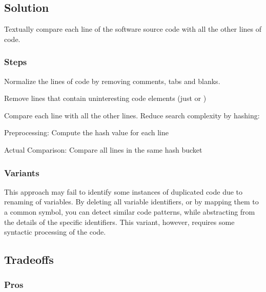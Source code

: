 \documentclass[a4paper,10pt,twoside]{book}
\begin{document}
\subsection*{Solution}

Textually compare each line of the software source code with all the other lines of code.

\subsubsection*{Steps}

\begin{bulletlist}
\item Normalize the lines of code by removing comments, tabs and blanks.

\item Remove lines that contain uninteresting code elements (\eg just  or \lct{\}})

\item Compare each line with all the other lines. Reduce search complexity by hashing:

\begin{bulletlist}
\item Preprocessing: Compute the hash value for each line
\item Actual Comparison: Compare all lines in the same hash bucket
\end{bulletlist}
\end{bulletlist}

\subsubsection*{Variants}

This approach may fail to identify some instances of duplicated code due to renaming of variables. By deleting all variable identifiers, or by mapping them to a common symbol, you can detect similar code patterns, while abstracting from the details of the specific identifiers. This variant, however, requires some syntactic processing of the code. 

\subsection*{Tradeoffs}

\subsubsection*{Pros}
\end{document}
